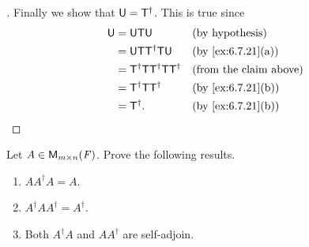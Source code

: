 \begin{proof}[]
  Finally we show that \(\mathsf{U} = \mathsf{T}^{\dag}\).
  This is true since
  \begin{align*}
    \U & = \U \T \U                            &  & \text{(by hypothesis)}        \\
       & = \U \T \T^{\dag} \T \U               &  & \by{ex:6.7.21}[a]             \\
       & = \T^{\dag} \T \T^{\dag} \T \T^{\dag} &  & \text{(from the claim above)} \\
       & = \T^{\dag} \T \T^{\dag}              &  & \by{ex:6.7.21}[b]             \\
       & = \T^{\dag}.                          &  & \by{ex:6.7.21}[b]
  \end{align*}
\end{proof}

\begin{ex}\label{ex:6.7.23}
  Let \(A \in \ms\).
  Prove the following results.
  \begin{enumerate}
    \item \(A A^{\dag} A = A\).
    \item \(A^{\dag} A A^{\dag} = A^{\dag}\).
    \item Both \(A^{\dag} A\) and \(A A^{\dag}\) are self-adjoin.
  \end{enumerate}
\end{ex}

